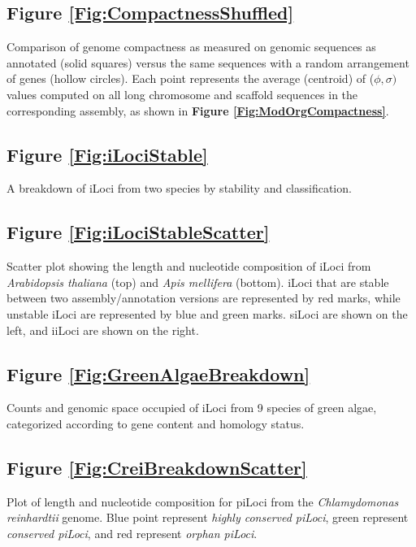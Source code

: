\subsection*{Figure \ref{Fig:CompactnessShuffled}}

\noindent
Comparison of genome compactness as measured on genomic sequences as annotated (solid squares) versus the same sequences with a random arrangement of genes (hollow circles). Each point represents the average (centroid) of ($\phi, \sigma)$ values computed on all long chromosome and scaffold sequences in the corresponding assembly, as shown in \textbf{Figure \ref{Fig:ModOrgCompactness}}.

\subsection*{Figure \ref{Fig:iLociStable}}

\noindent
A breakdown of iLoci from two species by stability and classification.

\subsection*{Figure \ref{Fig:iLociStableScatter}}

\noindent
Scatter plot showing the length and nucleotide composition of iLoci from \textit{Arabidopsis thaliana} (top) and \textit{Apis mellifera} (bottom). iLoci that are stable between two assembly/annotation versions are represented by red marks, while unstable iLoci are represented by blue and green marks. siLoci are shown on the left, and iiLoci are shown on the right.

\subsection*{Figure \ref{Fig:GreenAlgaeBreakdown}}

\noindent
Counts and genomic space occupied of iLoci from 9 species of green algae, categorized according to gene content and homology status.

\subsection*{Figure \ref{Fig:CreiBreakdownScatter}}

\noindent
Plot of length and nucleotide composition for piLoci from the \textit{Chlamydomonas reinhardtii} genome. Blue point represent \textit{highly conserved piLoci}, green represent \textit{conserved piLoci}, and red represent \textit{orphan piLoci}.

